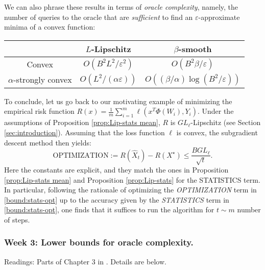 We can also phrase these results in terms of \emph{oracle complexity}, namely, the number of queries to the oracle that are \emph{sufficient} to find an $\varepsilon$-approximate minima of a convex function:
\begin{center}
 \begin{tabular}{|c | c | c|}
 \hline
 & $L$-Lipschitz & $\beta$-smooth\\
 \hline
 Convex & $O(B^2L^2/\varepsilon^2)$ & $O(B^2\beta/\varepsilon)$\\
 \hline
 $\alpha$-strongly convex & $O(L^2/(\alpha \varepsilon))$ & $O((\beta/\alpha)\log{(B^2/\varepsilon)})$\\
 \hline
\end{tabular}
\end{center}

	
\begin{remark}\label{rem:optimization}
To conclude, let us go back to our motivating example of minimizing the empirical risk function $R(x) = \frac{1}{m}\sum_{i=1}^m \ell(x^T\Phi(W_i),Y_i)$. Under the assumptions of Proposition \ref{prop:Lip-stats mean}, $R$ is $GL_\ell$-Lipschitz (see Section \ref{sec:introduction}). Assuming that the loss function $\ell$ is convex, the subgradient descent method then yields:
$$
	\textrm{OPTIMIZATION} := R(\hat X_t) - R(X^\star) \le \frac{BGL_\ell}{\sqrt{t}}.
$$
Here the constants are explicit, and they match the ones in Proposition \ref{prop:Lip-stats mean} and Proposition \ref{prop:Lip-stats} for the \textrm{STATISTICS} term. In particular, following the rationale of optimizing the \emph{OPTIMIZATION} term in \eqref{bound:stats-opt} up to the accuracy given by the \emph{STATISTICS} term in \eqref{bound:stats-opt}, one finds that it suffices to run the algorithm for $t\sim m$ number of steps.
\end{remark}

\subsubsection*{Week 3: Lower bounds for oracle complexity.}
Readings: Parts of Chapter 3 in \cite{bubeck}. Details are below.\\

